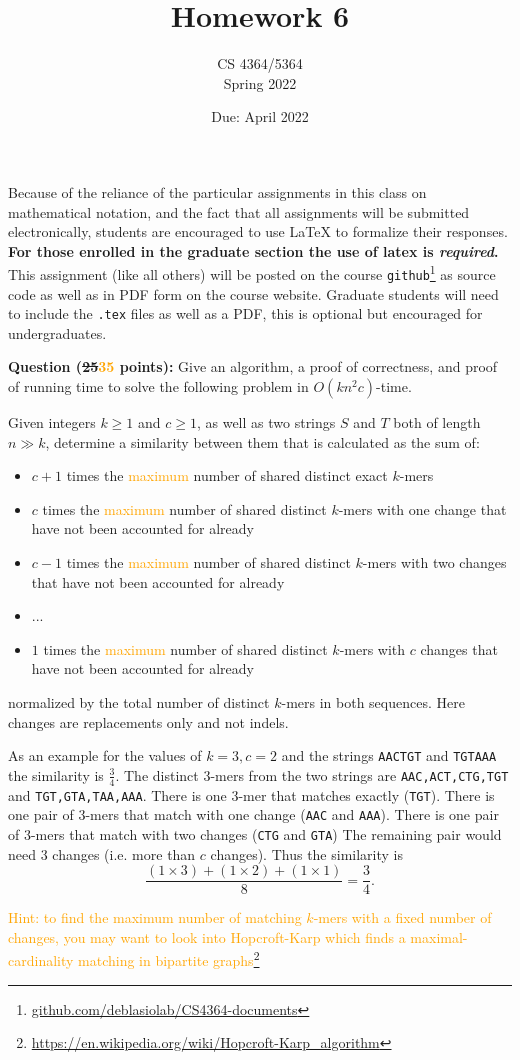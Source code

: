 \documentclass[11pt, oneside]{article}   	%
\title{Homework 6}
\author{CS 4364/5364\\Spring 2022}
\date{Due: \change{6}{13} April 2022}							%
\newcommand{\change}[2]{\sout{#1}\xspace\textcolor{orange}{#2}}
\newcommand{\add}[1]{\textcolor{orange}{#1}}
\begin{document}
\maketitle

Because of the reliance of the particular assignments in this class on mathematical notation, 
and the fact that all assignments will be submitted electronically, 
students are encouraged to use \LaTeX{} to formalize their responses. 
\textbf{For those enrolled in the graduate section the use of latex is \emph{required}.}
This assignment (like all others) will be posted on the course \texttt{github}\footnote{\url{github.com/deblasiolab/CS4364-documents}} as source code as well as in PDF form on the course website. 
Graduate students will need to include the \texttt{.tex} files as well as a PDF, this is optional but encouraged for undergraduates. 

\textbf{Question (\change{25}{35} points):} 
Give an algorithm, a proof of correctness, and proof of running time to solve the following problem in $O(kn^2c)$-time.

Given integers $k\ge1$ and $c\ge1$, as well as two strings $S$ and $T$ both of length $n \gg k$, determine a similarity between them that is calculated as the sum of: 
\begin{itemize}
\item $c+1$ times the \add{maximum} number of shared distinct exact $k$-mers
\item $c$ times the \add{maximum} number of shared distinct $k$-mers with one change that have not been accounted for already
\item $c-1$ times the \add{maximum}  number of shared distinct $k$-mers with two changes that have not been accounted for already
\item ...
\item $1$ times the \add{maximum} number of shared distinct $k$-mers with $c$ changes that have not been accounted for already
\end{itemize}
normalized by the total number of distinct $k$-mers in both sequences.
Here changes are replacements only and not indels. 

As an example for the values of $k=3, c=2$ and the strings \texttt{AACTGT} and \texttt{TGTAAA} the similarity is $\frac{3}{4}$. 
The distinct $3$-mers from the two strings are \texttt{AAC,ACT,CTG,TGT} and \texttt{TGT,GTA,TAA,AAA}.
There is one $3$-mer that matches exactly (\texttt{TGT}).
There is one pair of $3$-mers that match with one change (\texttt{AAC} and \texttt{AAA}).
There is one pair of $3$-mers that match with two changes (\texttt{CTG} and \texttt{GTA})
The remaining pair would need 3 changes (i.e. more than $c$ changes). 
Thus the similarity is 
\[
\frac{(1\times 3) + (1 \times 2) + (1 \times 1)}{8} = \frac{3}{4}.
\]

\add{Hint: to find the maximum number of matching $k$-mers with a fixed number of changes, you may want to look into Hopcroft-Karp which finds a maximal-cardinality matching in bipartite graphs\footnote{\url{https://en.wikipedia.org/wiki/Hopcroft-Karp_algorithm}}}
\end{document}
